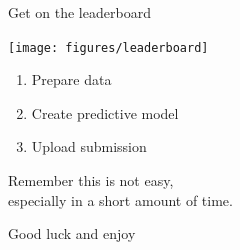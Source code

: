 \documentclass[aspectratio=169]{beamer}
\begin{document}
\begin{frame}{Get on the leaderboard}

\texttt{[image: figures/leaderboard]}

\end{frame}
\begin{frame}

\begin{enumerate}
\item Prepare data
\item Create predictive model
\item Upload submission
\end{enumerate}

\end{frame}
\begin{frame}

\begin{center}
\LARGE Remember this is not easy,\\ especially in a short amount of time.
\end{center}

\end{frame}
\begin{frame}

\begin{center}
\LARGE Good luck and enjoy
\end{center}

\end{frame}
\end{document}
